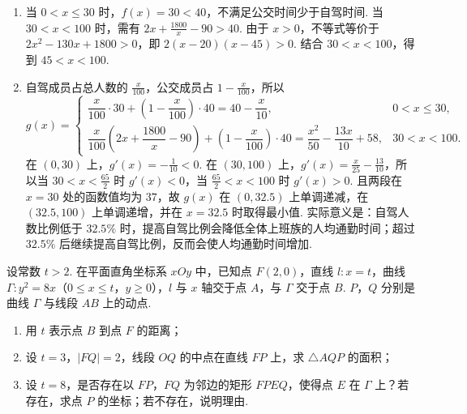\begin{solution}
\begin{enumerate}
\item 当 \(0<x\le30\) 时，\(f(x)=30<40\)，不满足公交时间少于自驾时间. 当 \(30<x<100\) 时，需有 \(2x+\frac{1800}{x}-90>40\). 由于 \(x>0\)，不等式等价于 \(2x^2-130x+1800>0\)，即 \(2(x-20)(x-45)>0\). 结合 \(30<x<100\)，得到 \(45<x<100\).
\item 自驾成员占总人数的 \(\frac{x}{100}\)，公交成员占 \(1-\frac{x}{100}\)，所以
\[
g(x)=
\begin{cases}
\dfrac{x}{100}\cdot30+\left(1-\dfrac{x}{100}\right)\cdot40=40-\dfrac{x}{10}, & 0<x\le30,\\
\dfrac{x}{100}\left(2x+\dfrac{1800}{x}-90\right)+\left(1-\dfrac{x}{100}\right)\cdot40=\dfrac{x^2}{50}-\dfrac{13x}{10}+58, & 30<x<100.
\end{cases}
\]
在 \((0,30)\) 上，\(g'(x)=-\frac1{10}<0\). 在 \((30,100)\) 上，\(g'(x)=\frac{x}{25}-\frac{13}{10}\)，所以当 \(30<x<\frac{65}{2}\) 时 \(g'(x)<0\)，当 \(\frac{65}{2}<x<100\) 时 \(g'(x)>0\). 且两段在 \(x=30\) 处的函数值均为 \(37\)，故 \(g(x)\) 在 \((0,32.5)\) 上单调递减，在 \((32.5,100)\) 上单调递增，并在 \(x=32.5\) 时取得最小值. 实际意义是：自驾人数比例低于 \(32.5\%\) 时，提高自驾比例会降低全体上班族的人均通勤时间；超过 \(32.5\%\) 后继续提高自驾比例，反而会使人均通勤时间增加.
\end{enumerate}
\end{solution}

\begin{problem}
设常数 \(t>2\). 在平面直角坐标系 \(xOy\) 中，已知点 \(F(2,0)\)，直线 \(l:x=t\)，曲线 \(\Gamma:y^2=8x\)（\(0\le x\le t\)，\(y\ge0\)），\(l\) 与 \(x\) 轴交于点 \(A\)，与 \(\Gamma\) 交于点 \(B\). \(P\)，\(Q\) 分别是曲线 \(\Gamma\) 与线段 \(AB\) 上的动点.

\begin{enumerate}
\item 用 \(t\) 表示点 \(B\) 到点 \(F\) 的距离；
\item 设 \(t=3\)，\(\lvert FQ\rvert=2\)，线段 \(OQ\) 的中点在直线 \(FP\) 上，求 \(\triangle AQP\) 的面积；
\item 设 \(t=8\)，是否存在以 \(FP\)，\(FQ\) 为邻边的矩形 \(FPEQ\)，使得点 \(E\) 在 \(\Gamma\) 上？若存在，求点 \(P\) 的坐标；若不存在，说明理由.
\end{enumerate}
\end{problem}

